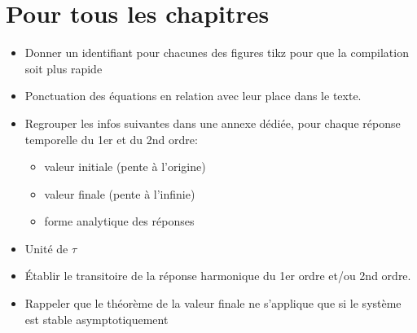\section*{Pour tous les chapitres}
\begin{itemize}
\item Donner un identifiant pour chacunes des figures tikz pour que la 
      compilation soit plus rapide
\item Ponctuation des équations en relation avec leur place dans le texte.
\item Regrouper les infos suivantes dans une annexe dédiée, pour chaque 
      réponse temporelle du 1er et du 2nd ordre:
    \begin{itemize}
        \item valeur initiale (pente à l'origine)
        \item valeur finale (pente à l'infinie)
        \item forme analytique des réponses
    \end{itemize}
\item Unité de $\tau$
\item \'Etablir le transitoire de la réponse harmonique du 1er ordre et/ou 
      2nd ordre.
\item Rappeler que le théorème de la valeur finale ne s'applique que si le 
      système est stable asymptotiquement
\end{itemize}
\section*{}     
